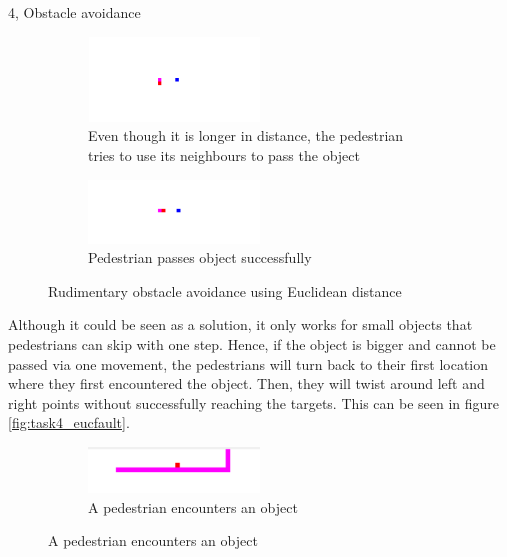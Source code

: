 \documentclass[10pt,a4paper]{article}
\begin{document}
\begin{task}{4, Obstacle avoidance}
\begin{figure}[H]
\begin{subfigure}[t]{0.5\textwidth}
 \end{subfigure}
\begin{subfigure}[t]{0.5\textwidth}
 \centering
 \includegraphics[width=0.5\textwidth]{images/task4_1object_passing.png}
 \caption{Even though it is longer in distance, the pedestrian tries to use its neighbours to pass the object}
 \end{subfigure}

 
\begin{center}   
\begin{subfigure}[t]{0.5\textwidth}
 \centering
 \includegraphics[width=0.5\textwidth]{images/task4_1object_passedpng.png}
 \caption{Pedestrian passes object successfully}
 \end{subfigure}
\end{center}
\caption{Rudimentary obstacle avoidance using Euclidean distance}
 \label{fig:task4_euc}
\end{figure}

Although it could be seen as a solution, it only works for small objects that pedestrians can skip with one step. Hence, if the object is bigger and cannot be passed via one movement, the pedestrians will turn back to their first location where they first encountered the object. Then, they will twist around left and right points without successfully reaching the targets. This can be seen in figure \ref{fig:task4_eucfault}.
\\


\begin{figure}[H]
\begin{subfigure}[t]{0.5\textwidth}
 \centering
 \includegraphics[width=0.5\textwidth]{images/task4_1object_touched_dummy.png}
 \caption{A pedestrian encounters an object}
 

\end{subfigure}
\end{figure}
\end{task}
\end{document}
